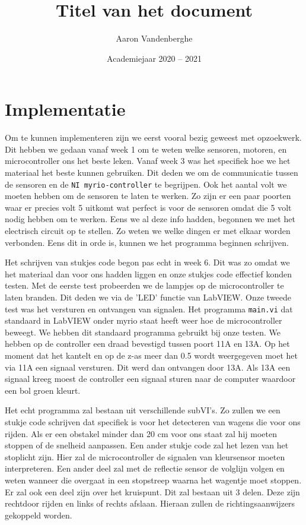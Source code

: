 \documentclass[a4paper,kulak]{kulakarticle} %
\date{Academiejaar 2020 -- 2021}
\title{Titel van het document}
\author{Aaron Vandenberghe}
\begin{document}
\section{Implementatie}

Om te kunnen implementeren zijn we eerst vooral bezig geweest met opzoekwerk. Dit hebben we gedaan vanaf week 1 om te weten welke sensoren, motoren, en microcontroller ons het beste leken. Vanaf week 3 was het specifiek hoe we het materiaal het beste kunnen gebruiken.
Dit deden we om de communicatie tussen de sensoren en de \texttt{NI myrio-controller} te begrijpen. Ook het aantal volt we moeten hebben om de sensoren te laten te werken. Zo zijn er een paar poorten waar er precies volt 5 uitkomt wat perfect is voor de sensoren omdat die 5 volt nodig hebben om te werken. Eens we al deze info hadden, begonnen we met het electrisch circuit op te stellen. Zo weten we welke dingen er met elkaar worden verbonden. Eens dit in orde is, kunnen we het programma beginnen schrijven.
 
Het schrijven van stukjes code begon pas echt in week 6. Dit was zo omdat we het materiaal dan voor ons hadden liggen en onze stukjes code effectief konden testen. Met de eerste test probeerden we de lampjes op de microcontroller te laten branden. Dit deden we via de 'LED' functie van LabVIEW. Onze tweede test was het versturen en ontvangen van signalen. Het programma \texttt{main.vi} dat standaard in LabVIEW onder myrio staat heeft weer hoe de microcontroller beweegt. We hebben dit standaard programma gebruikt bij onze testen. We hebben op de controller een draad bevestigd tussen poort 11A en 13A. Op het moment dat het kantelt en op de z-as meer dan 0.5 wordt weergegeven moet het via 11A een signaal versturen. Dit werd dan ontvangen door 13A. Als 13A een signaal kreeg moest de controller een signaal sturen naar de computer waardoor een bol groen kleurt. 

Het echt programma zal bestaan uit verschillende subVI's. Zo zullen we een stukje code schrijven dat specifiek is voor het detecteren van wagens die voor ons rijden. Als er een obstakel minder dan 20 cm voor ons staat zal hij moeten stoppen of de snelheid aanpassen. Een ander stukje code zal het lezen van het stoplicht zijn. Hier zal de microcontroller de signalen van kleursensor moeten interpreteren. Een ander deel zal met de reflectie sensor de volglijn volgen en weten wanneer die overgaat in een stopstreep waarna het wagentje moet stoppen.
Er zal ook een deel zijn over het kruispunt. Dit zal bestaan uit 3 delen. Deze zijn rechtdoor rijden en links of rechts afslaan. Hieraan zullen de richtingsaanwijzers gekoppeld worden. 
\end{document}
